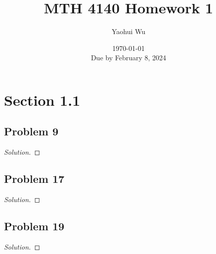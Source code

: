 \documentclass[12pt, letterpaper]{article}
\title{MTH 4140 Homework 1}
\author{Yaohui Wu}
\date{\today \\ Due by February 8, 2024}
\newenvironment{solution}{\begin{proof}[Solution]}{\end{proof}}
\begin{document}
\maketitle
\tableofcontents
\section{Section 1.1}
\subsection{Problem 9}
\begin{solution}
    
\end{solution}

\subsection{Problem 17}
\begin{solution}
    
\end{solution}

\subsection{Problem 19}
\begin{solution}
    
\end{solution}
\end{document}
